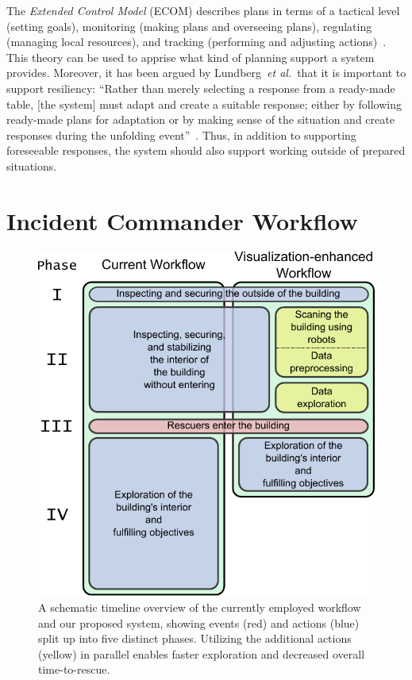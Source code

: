 \documentclass{egpubl}
\def\etal{\textit{et al.}}
\begin{document}
The \emph{Extended Control Model} (ECOM) describes plans in terms of a tactical level (setting goals), monitoring (making plans and overseeing plans), regulating (managing local resources), and tracking (performing and adjusting actions)~\cite{hollnagel2005joint}. This theory can be used to apprise what kind of planning support a system provides.  Moreover, it has been argued by Lundberg~\etal\ that it is important to support resiliency: ``Rather than merely selecting a response from a ready-made table, [the system] must adapt and create a suitable response; either by following ready-made plans for adaptation or by making sense of the situation and create responses during the unfolding event''~\cite{Lundberg2012}. Thus, in addition to supporting foreseeable responses, the system should also support working outside of prepared situations.


\section{Incident Commander Workflow} \label{sec:workflow}

\begin{figure}
	\centering
	\includegraphics[height=0.85\columnwidth]{figures/workflow.pdf}
	\caption{A schematic timeline overview of the currently employed workflow and our proposed system, showing events (red) and actions (blue) split up into five distinct phases. Utilizing the additional actions (yellow) in parallel enables faster exploration and decreased overall time-to-rescue.}
	\label{fig:workflow:workflow}
\end{figure}
\end{document}
